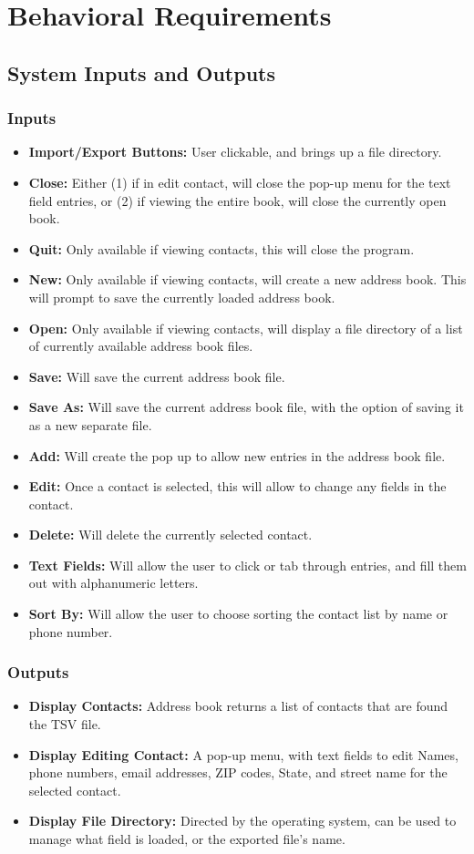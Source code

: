 \documentclass[a4paper, 11pt]{article}
\begin{document}
\section{Behavioral Requirements}
\subsection{System Inputs and Outputs}
\subsubsection{Inputs}
\begin{itemize}
	\item \textbf{Import/Export Buttons: }User clickable, and brings up a file directory.
	\item \textbf{Close: }Either (1) if in edit contact, will close the pop-up menu for the text field entries, or (2) if viewing the entire book, will close the currently open book.
	\item \textbf{Quit: }Only available if viewing contacts, this will close the program.
	\item \textbf{New: }Only available if viewing contacts, will create a new address book. This will prompt to save the currently loaded address book.
	\item \textbf{Open: }Only available if viewing contacts, will display a file directory of a list of currently available address book files.
	\item \textbf{Save: }Will save the current address book file.
	\item \textbf{Save As: }Will save the current address book file, with the option of saving it as a new separate file.
	\item \textbf{Add: }Will create the pop up to allow new entries in the address book file.
	\item \textbf{Edit: }Once a contact is selected, this will allow to change any fields in the contact.
	\item \textbf{Delete: }Will delete the currently selected contact.
	\item \textbf{Text Fields: }Will allow the user to click or tab through entries, and fill them out with alphanumeric letters.
	\item \textbf{Sort By: }Will allow the user to choose sorting the contact list by name or phone number.
\end{itemize}
\subsubsection{Outputs}
\begin{itemize}
	\item \textbf{Display Contacts: } Address book returns a list of contacts that are found the TSV file.
	\item \textbf{Display Editing Contact: } A pop-up menu, with text fields to edit Names, phone numbers, email addresses, ZIP codes, State, and street name for the selected contact.
	\item \textbf{Display File Directory: }Directed by the operating system, can be used to manage what field is loaded, or the exported file's name.
\end{itemize}
\end{document}
